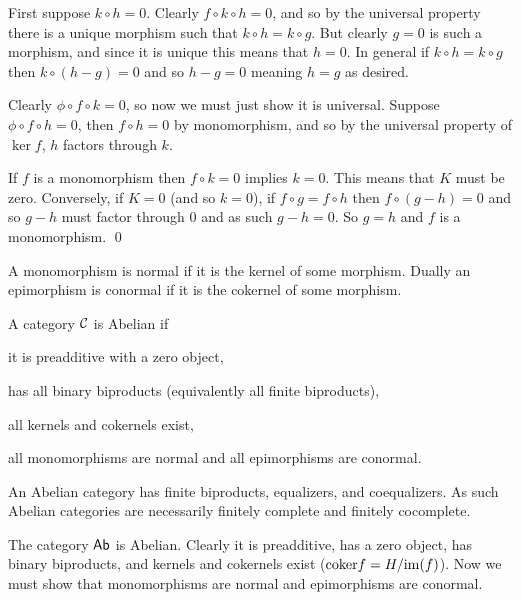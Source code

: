 \eprop

\bproof

    \benum
        \item First suppose $k\circ h=0$.
        Clearly $f\circ k\circ h=0$, and so by the universal property there is a unique morphism such that $k\circ h=k\circ g$.
        But clearly $g=0$ is such a morphism, and since it is unique this means that $h=0$.
        In general if $k\circ h=k\circ g$ then $k\circ(h-g)=0$ and so $h-g=0$ meaning $h=g$ as desired.

        \item Clearly $\phi\circ f\circ k=0$, so now we must just show it is universal.
        Suppose $\phi\circ f\circ h=0$, then $f\circ h=0$ by monomorphism, and so by the universal property of $\ker f$, $h$ factors through $k$.

        \item If $f$ is a monomorphism then $f\circ k=0$ implies $k=0$.
        This means that $K$ must be zero.
        Conversely, if $K=0$ (and so $k=0$), if $f\circ g=f\circ h$ then $f\circ(g-h)=0$ and so $g-h$ must factor through $0$ and as such $g-h=0$.
        So $g=h$ and $f$ is a monomorphism.
        \qed
    \eenum

\eproof

\bdefn

    A monomorphism is {\emphcolor normal} if it is the kernel of some morphism.
    Dually an epimorphism is {\emphcolor conormal} if it is the cokernel of some morphism.

\edefn

\bdefn

    A category ${{\cal C}}$ is {\emphcolor Abelian} if
    \benum
        \item it is preadditive with a zero object,
        \item has all binary biproducts (equivalently all finite biproducts),
        \item all kernels and cokernels exist,
        \item all monomorphisms are normal and all epimorphisms are conormal.
    \eenum

\edefn

An Abelian category has finite biproducts, equalizers, and coequalizers.
As such Abelian categories are necessarily finitely complete and finitely cocomplete.

\bexam

    The category ${\sf Ab}$ is Abelian.
    Clearly it is preadditive, has a zero object, has binary biproducts, and kernels and cokernels exist (${\rm coker} f=H/{\rm im}(f)$).
    Now we must show that monomorphisms are normal and epimorphisms are conormal.


